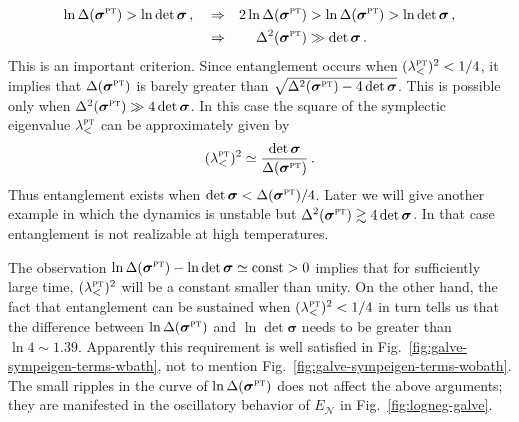 \documentclass[11pt,a4paper]{article}
\begin{document}
\begin{align}\label{E:dfhgvd}
	\ln\Delta(\bm{\sigma}^{\textsc{pt}})&>\ln\det \bm{\sigma}\,,&&\Rightarrow&2\ln\Delta(\bm{\sigma}^{\textsc{pt}})&>\ln\Delta(\bm{\sigma}^{\textsc{pt}})>\ln\det\bm{\sigma}\,,\notag\\
 &&&\Rightarrow&\Delta^{2}(\bm{\sigma}^{\textsc{pt}})&\gg\det\bm{\sigma}\,.
\end{align}
This is an important criterion. Since entanglement occurs when $(\lambda_{<}^{\textsc{pt}})^{2}<1/4$, it implies that $\Delta(\bm{\sigma}^{\textsc{pt}})$ is barely greater than $\sqrt{\Delta^{2}(\bm{\sigma}^{\textsc{pt}})-4\det \bm{\sigma}}$. This is possible only when $\Delta^{2}(\bm{\sigma}^{\textsc{pt}})\gg4\det \bm{\sigma}$. In this case the square of the symplectic eigenvalue $\lambda_{<}^{\textsc{pt}}$ can be approximately given by
\begin{equation}
    (\lambda_{<}^{\textsc{pt}})^2\simeq \frac{\det\bm{\sigma}}{\Delta(\bm{\sigma}^{\textsc{pt}})}\,.
\end{equation}
Thus entanglement exists when $\det\bm{\sigma}<\Delta(\bm{\sigma}^{\textsc{pt}})/4$. Later we will give another example in which the dynamics is unstable but $\Delta^{2}(\bm{\sigma}^{\textsc{pt}})\gtrsim4\det \bm{\sigma}$. In that case entanglement is not realizable at high temperatures.



The observation $\ln\Delta(\bm{\sigma}^{\textsc{pt}})-\ln\det \bm{\sigma}\simeq\text{const}>0$ implies that for sufficiently large time, $(\lambda_{<}^{\textsc{pt}})^{2}$ will be a constant smaller than unity. On the other hand, the fact that entanglement can be sustained when $(\lambda_{<}^{\textsc{pt}})^{2}<1/4$ in turn tells us that the difference between $\ln\Delta(\bm{\sigma}^{\textsc{pt}})$ and $\ln\det \bm{\sigma}$ needs to be greater than $\ln4\sim1.39$. Apparently this requirement is well satisfied in Fig.~\ref{fig:galve-sympeigen-terms-wbath}, not to mention Fig.~\ref{fig:galve-sympeigen-terms-wobath}. The small ripples in the curve of $\ln\Delta(\bm{\sigma}^{\textsc{pt}})$ does not affect the above arguments; they are manifested in the oscillatory behavior of $E_{\mathcal{N}}$ in Fig.~\ref{fig:logneg-galve}. 
\end{document}

